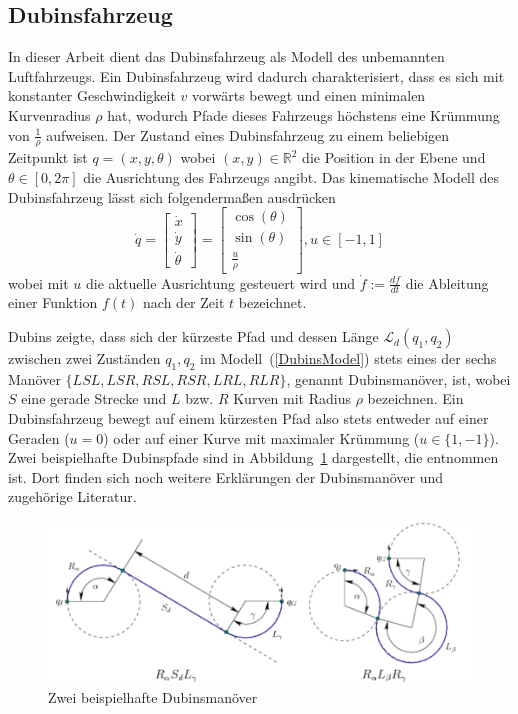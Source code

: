 \documentclass[12pt,a4paper,twoside]{article}
\theoremstyle{definition}
\numberwithin{equation}{section}
\begin{document}
\subsection{Dubinsfahrzeug}\label{subsection:Dubinsvehicle}
In dieser Arbeit dient das Dubinsfahrzeug als Modell des unbemannten Luftfahrzeugs. Ein Dubinsfahrzeug wird dadurch charakterisiert, dass es sich mit konstanter Geschwindigkeit $v$ vorwärts bewegt und einen minimalen Kurvenradius $\rho$ hat, wodurch Pfade dieses Fahrzeugs höchstens eine Krümmung von $\frac{1}{\rho}$ aufweisen.
Der Zustand eines Dubinsfahrzeug zu einem beliebigen Zeitpunkt ist $q = (x,y,\theta)$ wobei $(x,y) \in \mathbb{R}^2$ die Position in der Ebene und $\theta \in [0,2\pi]$ die Ausrichtung des Fahrzeugs angibt. Das kinematische Modell des Dubinsfahrzeug lässt sich folgendermaßen ausdrücken
\begin{equation}
	\dot{q} = \begin{bmatrix} \dot{x}\\
		\dot{y}\\
		\dot{\theta}
	 \end{bmatrix} 
 = \begin{bmatrix} \cos(\theta)\\
	 \sin(\theta)\\
	 \frac{u}{\rho}
 \end{bmatrix}, u \in [-1,1] 
\label{DubinsModel}
\end{equation}
wobei mit $u$ die aktuelle Ausrichtung gesteuert wird und $\dot{f} := \frac{df}{dt}$ die Ableitung einer Funktion $f(t)$ nach der Zeit $t$ bezeichnet.

Dubins \cite{Dubins.1957} zeigte, dass sich der kürzeste Pfad und dessen Länge $\mathcal{L}_d(q_1,q_2)$ zwischen zwei Zuständen $q_1,q_2$ im Modell~(\ref{DubinsModel}) stets eines der sechs Manöver $\{LSL,LSR,RSL,RSR,LRL,RLR\}$, genannt Dubinsmanöver, ist, wobei $S$ eine gerade Strecke und $L$ bzw. $R$ Kurven mit Radius $\rho$ bezeichnen. Ein Dubinsfahrzeug bewegt auf einem kürzesten Pfad also stets entweder auf einer Geraden ($u = 0$) oder auf einer Kurve mit maximaler Krümmung ($u \in \{1,-1\}$). Zwei beispielhafte Dubinspfade sind in Abbildung~\ref{fig:DubinsPaths.png} dargestellt, die \cite{LaValle.2006} entnommen ist. Dort finden sich noch weitere Erklärungen der Dubinsmanöver und zugehörige Literatur.

\begin{figure}[h]
	\begin{center}
		\includegraphics[scale=0.8]{DubinsPaths.png}
	\end{center}
	\caption{Zwei beispielhafte Dubinsmanöver}
	\label{fig:DubinsPaths.png}
\end{figure}
\end{document}
